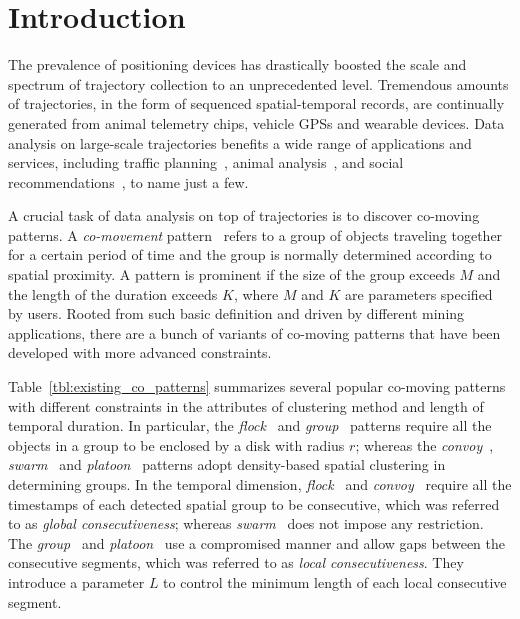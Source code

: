 \section{Introduction}
The prevalence of positioning devices has drastically boosted 
the scale and spectrum of trajectory collection to an unprecedented level. 
Tremendous amounts of trajectories, in the form of sequenced spatial-temporal 
records, are continually generated from animal telemetry chips, 
vehicle GPSs and wearable devices. Data analysis on large-scale 
trajectories benefits a wide range of applications and services, 
including traffic planning~\cite{zheng2011urban}, animal analysis~\cite{li2010miningperiodic}, and social recommendations~\cite{bao2013survey}, to name just a few.


A crucial task of data analysis on top of trajectories is 
to discover co-moving patterns. A \emph{co-movement} pattern~\cite{li2013managing} 
refers to a group of objects traveling together for a certain period of time 
and the group is normally determined according to spatial proximity. 
A pattern is prominent if the size of the group exceeds $M$ and the length of the duration exceeds $K$, where $M$ and $K$ are parameters specified by users. Rooted from such basic definition 
and driven by different mining applications, there are a bunch of variants 
of co-moving patterns that have been developed with more advanced constraints.

Table~\ref{tbl:existing_co_patterns} summarizes several popular co-moving patterns 
with different constraints in the attributes of clustering method and length of temporal duration. 
In particular,  the \emph{flock}~\cite{gudmundsson2006flock} 
and \emph{group}~\cite{wang2006grouppattern} patterns require 
all the objects in a group to be enclosed by a disk with radius $r$; 
whereas the \emph{convoy}~\cite{jeung2008convoy}, \emph{swarm}~\cite{li2010swarm} 
and \emph{platoon}~\cite{li2015platoon} patterns adopt density-based 
spatial clustering in determining groups. 
In the temporal dimension, \emph{flock}~\cite{gudmundsson2006flock} 
and \emph{convoy}~\cite{jeung2008convoy} require all the timestamps 
of each detected spatial group to be consecutive, which was referred to as \emph{global consecutiveness}; 
whereas \emph{swarm}~\cite{li2010swarm} does not impose any restriction. 
The \emph{group}~\cite{wang2006grouppattern} and \emph{platoon}~\cite{li2015platoon} use a compromised manner and allow gaps between the consecutive segments, which was referred to as \emph{local consecutiveness}. 
They introduce a parameter $L$ to control the minimum length of each local consecutive segment.


